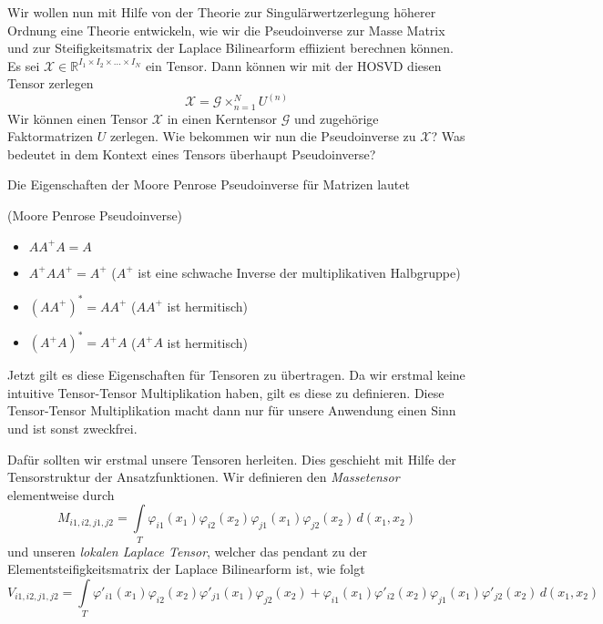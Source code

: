 Wir wollen nun mit Hilfe von der Theorie zur Singulärwertzerlegung höherer Ordnung eine Theorie entwickeln, wie wir die Pseudoinverse zur Masse Matrix und zur Steifigkeitsmatrix der Laplace Bilinearform effiizient berechnen können. 
Es sei $\pmb{\mathscr{X}}  \in \mathbb{R}^{I_1 \times I_2 \times \dots \times I_N}$ ein Tensor. Dann können wir mit der HOSVD diesen Tensor zerlegen
\begin{equation}
\pmb{\mathscr{X}} = \pmb{\mathscr{G}} \times_{n=1}^{N} U^{ (n) }
\end{equation}
Wir können einen Tensor $\pmb{\mathscr{X}}$ in einen Kerntensor $\pmb{\mathscr{G}}$ und zugehörige Faktormatrizen $U$ zerlegen. Wie bekommen wir nun die Pseudoinverse zu $\pmb{\mathscr{X}}$? Was bedeutet in dem Kontext eines Tensors überhaupt Pseudoinverse?

Die Eigenschaften der Moore Penrose Pseudoinverse für Matrizen lautet
\begin{Lemma} (Moore Penrose Pseudoinverse) 
\begin{itemize}
\item $AA^{+}A=A$
\item $A^{+}AA^{+}=A^{+}$ ($A^{+}$ ist eine schwache Inverse der multiplikativen Halbgruppe)
\item $(AA^{+})^{*}=AA^{+}$ ($AA^{+}$ ist hermitisch)
\item $(A^{+}A)^{*}=A^{+}A$ ($A^{+}A$ ist hermitisch)
\end{itemize}
\end{Lemma}

Jetzt gilt es diese Eigenschaften für Tensoren zu übertragen. Da wir erstmal keine intuitive Tensor-Tensor Multiplikation haben, gilt es diese zu definieren. Diese Tensor-Tensor Multiplikation macht dann nur für unsere Anwendung einen Sinn und ist sonst zweckfrei.

Dafür sollten wir erstmal unsere Tensoren herleiten. Dies geschieht mit Hilfe der Tensorstruktur der Ansatzfunktionen.
Wir definieren den \textit{Massetensor} elementweise durch
\begin{equation} 
M_{i1,i2,j1,j2} = \int\limits_{T} \varphi_{i1} (x_1) \varphi_{i2}(x_2) \varphi_{j1} (x_1) \varphi_{j2} (x_2) \, d(x_1,x_2)
\end{equation}
und unseren \textit{lokalen Laplace Tensor}, welcher das pendant zu der Elementsteifigkeitsmatrix der Laplace Bilinearform ist, wie folgt
\begin{equation} 
V_{i1,i2,j1,j2} = \int\limits_{T} \varphi'_{i1} (x_1) \varphi_{i2}(x_2) \varphi'_{j1} (x_1) \varphi_{j2} (x_2) +
\varphi_{i1} (x_1) \varphi'_{i2}(x_2) \varphi_{j1} (x_1) \varphi'_{j2} (x_2) \, d(x_1,x_2)
\end{equation}

